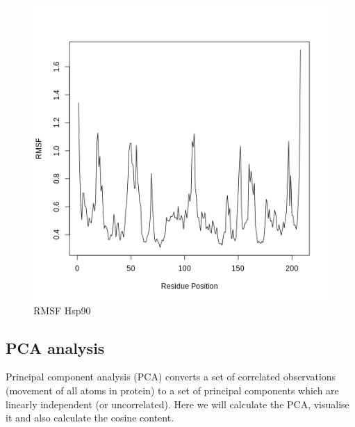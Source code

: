 \documentclass[twocolumn]{bmcart}%
\begin{document}
\begin{figure}
\centering
\includegraphics{images/htmd_analysis_rmsf.png}
\caption{RMSF Hsp90}
\end{figure}

\hypertarget{pca-analysis}{%
\subsection{PCA analysis}\label{pca-analysis}}

Principal component analysis (PCA) converts a set of correlated
observations (movement of all atoms in protein) to a set of principal
components which are linearly independent (or uncorrelated). Here we
will calculate the PCA, visualise it and also calculate the cosine
content.
\end{document}
